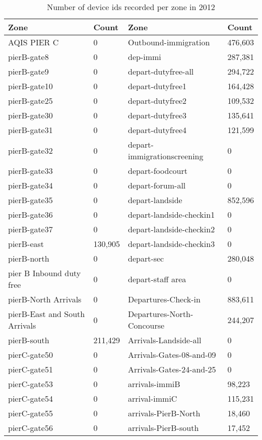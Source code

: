 \documentclass[11pt,onecolumn]{IEEEtran}
\begin{document}
\begin{center}
\begin{table}[H]
\caption{ Number of device ids recorded per zone in 2012}
\centering
\begin{tabular}{|l|l|l|l|}
\hline
Zone & Count & Zone & Count\\
\hline
AQIS PIER C	& 0	& Outbound-immigration	& 476,603\\
pierB-gate8	& 0	& dep-immi		& 287,381\\
pierB-gate9	& 0	& depart-dutyfree-all	& 294,722\\
pierB-gate10	& 0		& depart-dutyfree1	& 164,428\\
pierB-gate25	& 0		& depart-dutyfree2	& 109,532\\
pierB-gate30	& 0 		& depart-dutyfree3	& 135,641\\
pierB-gate31	& 0		& depart-dutyfree4	& 121,599\\
pierB-gate32	& 0		& depart-immigrationscreening	& 0 \\
pierB-gate33	& 0		& depart-foodcourt	& 0\\
pierB-gate34	& 0& depart-forum-all	& 0\\
pierB-gate35	& 0		& depart-landside	& 852,596 \\
pierB-gate36	& 0		& depart-landside-checkin1	& 0\\
pierB-gate37	& 0& depart-landside-checkin2	& 0\\
pierB-east	& 130,905	& depart-landside-checkin3	& 0\\
pierB-north	& 0		& depart-sec		& 280,048\\
pier B Inbound duty free & 0		& depart-staff area	& 0\\
pierB-North Arrivals & 0		& Departures-Check-in	& 883,611\\
pierB-East and South Arrivals	& 0		& Departures-North-Concourse	& 244,207\\
pierB-south	& 211,429		& Arrivals-Landside-all	& 0 \\
pierC-gate50	& 0		& Arrivals-Gates-08-and-09	& 0\\
pierC-gate51 	& 0		& Arrivals-Gates-24-and-25	& 0\\
pierC-gate53	& 0		& arrivals-immiB	& 98,223\\
pierC-gate54	& 0		& arrival-immiC		& 115,231\\
pierC-gate55 	& 0		& arrivals-PierB-North	& 18,460\\
pierC-gate56	& 0		& arrivals-PierB-south	& 17,452\\

\end{tabular}
\end{table}
\end{center}
\end{document}

